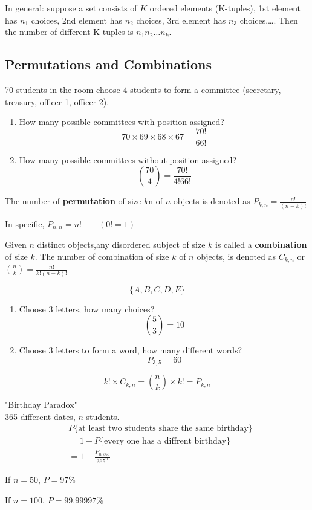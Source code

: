 In general: suppose a set consists of $K$ ordered elements (K-tuples), 1st element has $n_1$ choices, 2nd element has $n_2$ choices, 3rd element has $n_3$ choices,\dots. Then the number of different K-tuples is $n_1 n_2 \dots n_k$.


\subsection{Permutations and Combinations}
\begin{exmp}
70 students in the room choose 4 students to form a committee (secretary, treasury, officer 1, officer 2).
\begin{enumerate}
\item How many possible committees with position assigned?
\[70 \times 69 \times 68 \times 67=\frac{70!}{66!} \]
\item How many possible committees without position assigned?
\[\binom {70} {4} =\frac{70!}{4!66!}\]
\end{enumerate}
\end{exmp}

\begin{defn}
The number of \textbf{permutation} of size $k$n of $n$ objects is denoted as $P_{k,n}=\frac{n!}{(n-k)!}$

In specific, $P_{n,n}=n!\qquad (0!=1)$
\end{defn}

\begin{defn}
Given $n$ distinct objects,any disordered subject of size $k$ is called a \textbf{combination} of size $k$. The number of combination of size $k$ of $n$ objects, is denoted as $C_{k,n}$ or $\binom nk=\frac{n!}{k!(n-k)!}$
\end{defn}


\begin{exmp}
\[\{A,B,C,D,E\}\]
\begin{enumerate}
\item  Choose 3 letters, how many choices?
\[\binom 53 =10\]
\item  Choose 3 letters to form a word, how many different words?
\[P_{3,5}=60\]
\end{enumerate}
\end{exmp}

\begin{prop}
\[k!\times C_{k,n}=\binom nk \times k!=P_{k,n}\]
\end{prop}

\begin{exmp}
"Birthday Paradox" \\
365 different dates, $n$ students.
\begin{align*}
&P\{\text{at least two students share the same birthday}\}\\
&=1-P\{\text{every one has a diffrent birthday}\}\\
&=1-\frac{P_{n,365}}{365^n}
\end{align*}

If $n=50$, $P=97\%$

If $n=100$, $P=99.99997\%$
\end{exmp}


